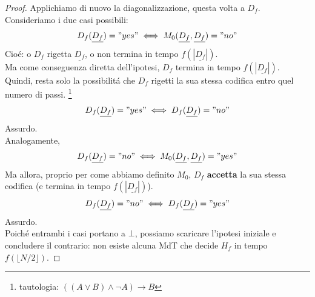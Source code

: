 \begin{proof}
Applichiamo di nuovo la diagonalizzazione, questa volta a $D_f$.
Consideriamo i due casi possibili:
\[ D_f(\underline{D_f}) = "yes" \iff M_0(\underline{D_f}, \underline{D_f}) = "no" \]
Cioé: o $D_f$ rigetta $\underline{D_f}$, o non termina in tempo $f(|\underline{D_f}|)$. \\
Ma come conseguenza diretta dell'ipotesi, $D_f$ termina in tempo $f(|\underline{D_f}|)$. 
Quindi, resta solo la possibilitá che $D_f$ rigetti la sua stessa codifica entro quel numero di passi.
\footnote{tautologia: $((A \lor B ) \land \neg A) \rightarrow B$} \\
\[ D_f(\underline{D_f}) = "yes" \iff D_f(\underline{D_f}) = "no" \]
Assurdo. \\

Analogamente, 
\[ D_f(\underline{D_f}) = "no" \iff M_0(\underline{D_f}, \underline{D_f}) = "yes" \]
Ma allora, proprio per come abbiamo definito $M_0$, $D_f$ \textbf{accetta} la sua stessa codifica (e termina in tempo $f(|\underline{D_f}|)$).
\[D_f(\underline{D_f}) = "no" \iff D_f(\underline{D_f}) = "yes"\]
Assurdo. \\

Poiché entrambi i casi portano a $\bot$, possiamo scaricare l'ipotesi iniziale e concludere il contrario: 
non esiste alcuna MdT che decide $H_f$ in tempo $f(\lfloor N/2 \rfloor)$.
\end{proof}

